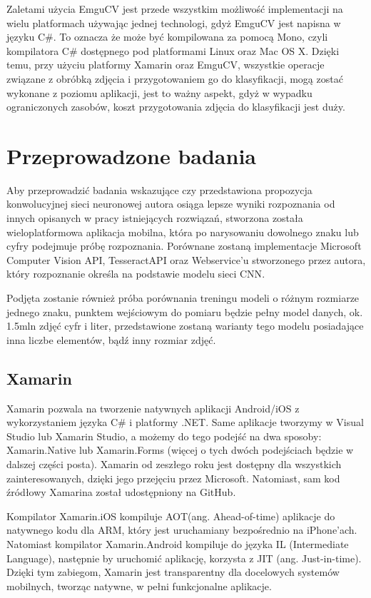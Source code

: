 \documentclass[brudnopis]{xmgr}
\begin{document}
Zaletami użycia EmguCV jest przede wszystkim możliwość implementacji na wielu platformach używając jednej technologi, gdyż EmguCV jest napisna w języku C\#. To oznacza że może być kompilowana za pomocą Mono, czyli kompilatora C\# dostępnego pod platformami Linux oraz Mac OS X. Dzięki temu, przy użyciu platformy Xamarin oraz EmguCV, wszystkie operacje związane z obróbką zdjęcia i przygotowaniem go do klasyfikacji, mogą zostać wykonane z poziomu aplikacji, jest to ważny aspekt, gdyż w wypadku ograniczonych zasobów, koszt przygotowania zdjęcia do klasyfikacji jest duży.

\chapter{Przeprowadzone badania}

Aby przeprowadzić badania wskazujące czy przedstawiona propozycja konwolucyjnej sieci neuronowej autora osiąga lepsze wyniki rozpoznania od innych opisanych w pracy istniejących rozwiązań, stworzona została wieloplatformowa aplikacja mobilna, która po narysowaniu dowolnego znaku lub cyfry podejmuje próbę rozpoznania.
Porównane zostaną implementacje Microsoft Computer Vision API\cite{9}, TesseractAPI\cite{10} oraz Webservice'u\cite{5} stworzonego przez autora, który rozpoznanie określa na podstawie modelu sieci CNN\cite{14}.

Podjęta zostanie również próba porównania treningu modeli o różnym rozmiarze jednego znaku, punktem wejściowym do pomiaru będzie pełny model danych, ok. 1.5mln zdjęć cyfr i liter, przedstawione zostaną warianty tego modelu posiadające inna liczbe elementów, bądź inny rozmiar zdjęć.

\section{Xamarin}

Xamarin\cite{15} pozwala na tworzenie natywnych aplikacji Android/iOS z wykorzystaniem języka C\# i platformy .NET. Same aplikacje tworzymy w Visual Studio lub Xamarin Studio, a możemy do tego podejść na dwa sposoby: Xamarin.Native lub Xamarin.Forms (więcej o tych dwóch podejściach będzie w dalszej części posta). Xamarin od zeszłego roku jest dostępny dla wszystkich zainteresowanych, dzięki jego przejęciu przez Microsoft. Natomiast, sam kod źródłowy Xamarina został udostępniony na GitHub.

Kompilator Xamarin.iOS kompiluje AOT(ang. Ahead-of-time) aplikacje do natywnego kodu dla ARM, który jest uruchamiany bezpośrednio na iPhone’ach.
Natomiast kompilator Xamarin.Android kompiluje do języka IL (Intermediate Language), następnie by uruchomić aplikację, korzysta z JIT (ang. Just-in-time).
Dzięki tym zabiegom, Xamarin jest transparentny dla docelowych systemów mobilnych, tworząc natywne, w pełni funkcjonalne aplikacje.
\end{document}
